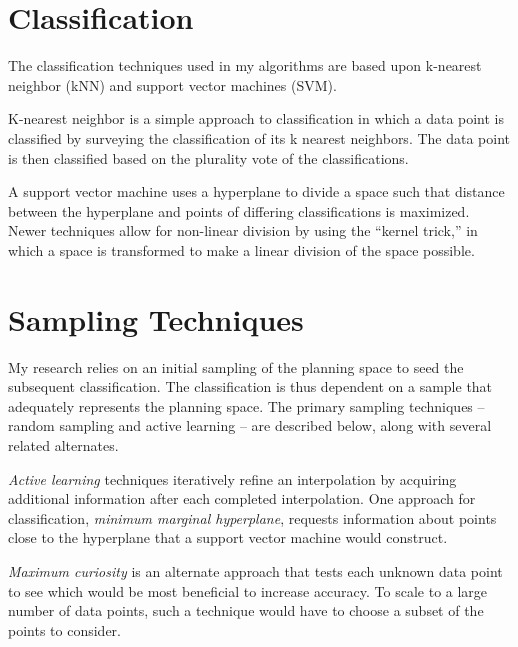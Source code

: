 \section{Classification}

The classification techniques used in my algorithms are based upon k-nearest neighbor (kNN) and support vector machines (SVM).

K-nearest neighbor \citep{cover67nearestneighbor} is a simple approach to classification in which a data point is classified by surveying the classification of its k nearest neighbors.  The data point is then classified based on the plurality vote of the classifications.  %

A support vector machine \citep{vapnik95svm} uses a hyperplane to divide a space such that distance between the hyperplane and points of differing classifications is maximized.  Newer techniques allow for non-linear division by using the ``kernel trick,'' in which a space is transformed to make a linear division of the space possible.




\section{Sampling Techniques}

My research relies on an initial sampling of the planning space to seed the subsequent classification.  The classification is thus dependent on a sample that adequately represents the planning space.  The primary sampling techniques -- random sampling and active learning -- are described below, along with several related alternates.



\textit{Active learning} \citep{Settles10activelearning} techniques iteratively refine an interpolation by acquiring additional information after each completed interpolation.  One approach for classification, \textit{minimum marginal hyperplane}, requests information about points close to the hyperplane that a support vector machine would construct.

\textit{Maximum curiosity} is an alternate approach that tests each unknown data point to see which would be most beneficial to increase accuracy.  To scale to a large number of data points, such a technique would have to choose a subset of the points to consider.


